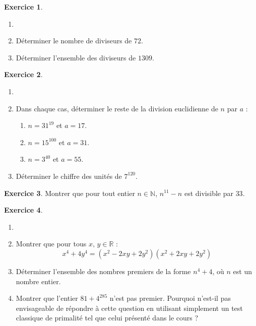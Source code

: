 \documentclass{article}
\theoremstyle{definition}
\newtheorem{exercice}{Exercice}
\begin{document}
\pagestyle{fancy}

\fancyhf{} %
\fancyhead[L]{\large \textbf{\Niveau}}
\fancyhead[C]{\large \textbf{\Chapitre}}

\large

\begin{exercice}
  \begin{enumerate}
    \item[]
    \item Déterminer le nombre de diviseurs de $72$.
    \item Déterminer l'ensemble des diviseurs de $1309$.
  \end{enumerate}
\end{exercice}

\begin{exercice}
  \begin{enumerate}
    \item[]
    \item Dans chaque cas, déterminer le reste de la division euclidienne de $n$ par $a$ :
    \begin{enumerate}
      \item $n = 31^{19}$ et $a = 17$.
      \item $n = 15^{100}$ et $a = 31$.
      \item $n = 3^{40}$ et $a = 55$.
    \end{enumerate}
    \item Déterminer le chiffre des unités de $7^{120}$.
  \end{enumerate}
\end{exercice}


\begin{exercice}
  Montrer que pour tout entier $n \in \mathbb{N}$, $n^{11} - n$ est divisible par $33$.
\end{exercice}

\begin{exercice}
  \begin{enumerate}
    \item[]
    \item Montrer que pour tous \(x,\,y \in \mathbb{R}\) :
      \[
        x^4 + 4y^4 = \left(x^2 - 2xy + 2y^2\right)\left(x^2 + 2xy + 2y^2\right)
      \]
    \item Déterminer l'ensemble des nombres premiers de la forme \(n^4 + 4\), où \(n\) est un nombre entier.
    \item Montrer que l'entier \(81 + 4^{285}\) n'est pas premier.
    Pourquoi n'est-il pas envisageable de répondre à cette question en utilisant simplement un test classique de primalité tel que celui présenté dans le cours ?
  \end{enumerate}
\end{exercice}
\end{document}
